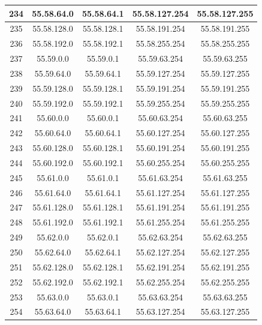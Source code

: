 \documentclass[letterpaper,12pt]{article}
\begin{document}
\begin{center}
\begin{longtable}{|c|c|c|c|c|}
                234 & 55.58.64.0 & 55.58.64.1 & 55.58.127.254 & 55.58.127.255 \\ \hline
                235 & 55.58.128.0 & 55.58.128.1 & 55.58.191.254 & 55.58.191.255 \\ \hline
                236 & 55.58.192.0 & 55.58.192.1 & 55.58.255.254 & 55.58.255.255 \\ \hline
                237 & 55.59.0.0 & 55.59.0.1 & 55.59.63.254 & 55.59.63.255 \\ \hline
                238 & 55.59.64.0 & 55.59.64.1 & 55.59.127.254 & 55.59.127.255 \\ \hline
                239 & 55.59.128.0 & 55.59.128.1 & 55.59.191.254 & 55.59.191.255 \\ \hline
                240 & 55.59.192.0 & 55.59.192.1 & 55.59.255.254 & 55.59.255.255 \\ \hline
                241 & 55.60.0.0 & 55.60.0.1 & 55.60.63.254 & 55.60.63.255 \\ \hline
                242 & 55.60.64.0 & 55.60.64.1 & 55.60.127.254 & 55.60.127.255 \\ \hline
                243 & 55.60.128.0 & 55.60.128.1 & 55.60.191.254 & 55.60.191.255 \\ \hline
                244 & 55.60.192.0 & 55.60.192.1 & 55.60.255.254 & 55.60.255.255 \\ \hline
                245 & 55.61.0.0 & 55.61.0.1 & 55.61.63.254 & 55.61.63.255 \\ \hline
                246 & 55.61.64.0 & 55.61.64.1 & 55.61.127.254 & 55.61.127.255 \\ \hline
                247 & 55.61.128.0 & 55.61.128.1 & 55.61.191.254 & 55.61.191.255 \\ \hline
                248 & 55.61.192.0 & 55.61.192.1 & 55.61.255.254 & 55.61.255.255 \\ \hline
                249 & 55.62.0.0 & 55.62.0.1 & 55.62.63.254 & 55.62.63.255 \\ \hline
                250 & 55.62.64.0 & 55.62.64.1 & 55.62.127.254 & 55.62.127.255 \\ \hline
                251 & 55.62.128.0 & 55.62.128.1 & 55.62.191.254 & 55.62.191.255 \\ \hline
                252 & 55.62.192.0 & 55.62.192.1 & 55.62.255.254 & 55.62.255.255 \\ \hline
                253 & 55.63.0.0 & 55.63.0.1 & 55.63.63.254 & 55.63.63.255 \\ \hline
                254 & 55.63.64.0 & 55.63.64.1 & 55.63.127.254 & 55.63.127.255 \\ \hline

\end{longtable}
\end{center}
\end{document}
